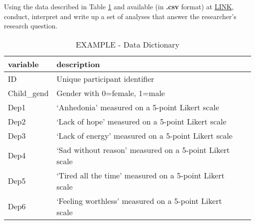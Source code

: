 \documentclass[
]{article}
\begin{document}
Using the data described in Table \ref{tab:tab1} and available (in
\textbf{.csv} format) at \href{url}{LINK}, conduct, interpret and write
up a set of analyses that answer the researcher's research question.

\begin{table}[H]

\caption{\label{tab:unnamed-chunk-1}\label{tab:tab1}EXAMPLE - Data Dictionary}
\centering
\begin{tabular}[t]{l>{\raggedright\arraybackslash}p{15cm}>{}p{15cm}}
\toprule
variable & description\\
\midrule
\rowcolor{gray!6}  ID & Unique participant identifier\\
Child\_gend & Gender with 0=female, 1=male\\
\rowcolor{gray!6}  Dep1 & ‘Anhedonia’ measured on a 5-point Likert scale\\
Dep2 & ‘Lack of hope’ measured on a 5-point Likert scale\\
\rowcolor{gray!6}  Dep3 & ‘Lack of energy’ measured on a 5-point Likert scale\\
\addlinespace
Dep4 & ‘Sad without reason’ measured on a 5-point Likert scale\\
\rowcolor{gray!6}  Dep5 & ‘Tired all the time’ measured on a 5-point Likert scale\\
Dep6 & ‘Feeling worthless’ measured on a 5-point Likert scale\\
\bottomrule
\end{tabular}
\end{table}
\end{document}
